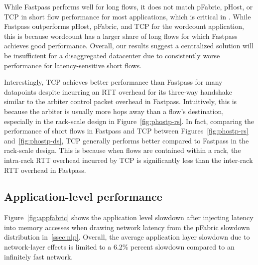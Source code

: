 While Fastpass performs well for long flows, it does not match pFabric, pHost, or TCP in short flow performance for most applications, which is critical in \dis. While Fastpass outperforms pHost, pFabric, and TCP for the wordcount application, this is because wordcount has a larger share of long flows for which Fastpass achieves good performance. Overall, our results suggest a centralized solution will be insufficient for a disaggregated datacenter due to consistently worse performance for latency-sensitive short flows.

Interestingly, TCP achieves better performance than Fastpass for many datapoints despite incurring an RTT overhead for its three-way handshake similar to the arbiter control packet overhead in Fastpass. Intuitively, this is because the arbiter is usually more hops away than a flow's destination, especially in the rack-scale design in Figure~\ref{fig:phostp-rs}. In fact, comparing the performance of short flows in Fastpass and TCP between Figures~\ref{fig:phostp-rs} and~\ref{fig:phostp-ds}, TCP generally performs better compared to Fastpass in the rack-scale design. This is because when flows are contained within a rack, the intra-rack RTT overhead incurred by TCP is significantly less than the inter-rack RTT overhead in Fastpass.


\subsection{Application-level performance}
\label{ssec:alp}
Figure~\ref{fig:appfabric} shows the application level slowdown after injecting latency into memory accesses when drawing network latency from the pFabric slowdown distribution in~\ref{ssec:nlp}. Overall, the average application layer slowdown due to network-layer effects is limited to a 6.2\% percent slowdown compared to an infinitely fast network. 

